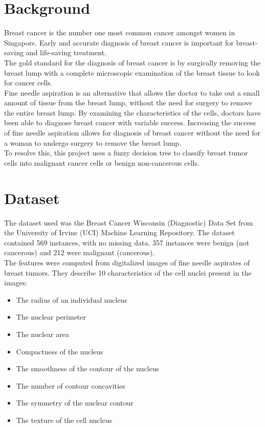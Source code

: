 
\section{Background}
Breast cancer is the number one most common cancer amongst women in Singapore. Early and accurate diagnosis of breast cancer is important for breast-saving and life-saving treatment. \\

The gold standard for the diagnosis of breast cancer is by surgically removing the breast lump with a complete microscopic examination of the breast tissue to look for cancer cells. \\

Fine needle aspiration is an alternative that allows the doctor to take out a small amount of tissue from the breast lump, without the need for surgery to remove the entire breast lump. By examining the characteristics of the cells, doctors have been able to diagnose breast cancer with variable success. Increasing the success of fine needle aspiration allows for diagnosis of breast cancer without the need for a woman to undergo surgery to remove the breast lump. \\

To resolve this, this project uses a fuzzy decision tree to classify breast tumor cells into malignant cancer cells or benign non-cancerous cells. \\

\section{Dataset}
The dataset used was the Breast Cancer Wisconsin (Diagnostic) Data Set from the University of Irvine (UCI) Machine Learning Repository. The dataset contained 569 instances, with no missing data. 357 instances were benign (not cancerous) and 212 were malignant (cancerous). \\

The features were computed from digitalized images of fine needle aspirates of breast tumors. They describe 10 characteristics of the cell nuclei present in the images:

\begin{itemize}
	\item The radius of an individual nucleus
	\item The nuclear perimeter
	\item The nuclear area
	\item Compactness of the nucleus
	\item The smoothness of the contour of the nucleus
	\item The number of contour concavities
	\item The symmetry of the nuclear contour
	\item The texture of the cell nucleus
\end{itemize}


